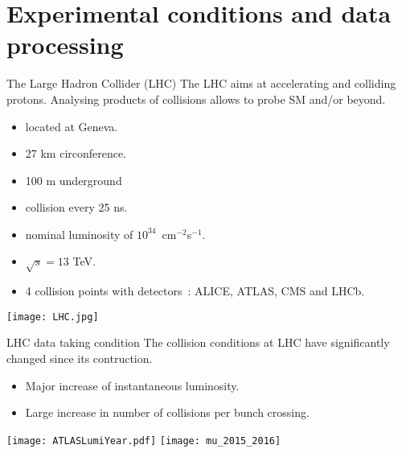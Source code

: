 \section{Experimental conditions and data processing}
\frame{\tableofcontents[currentsection]}

\begin{frame}{The Large Hadron Collider (LHC)}
  The LHC aims at accelerating and colliding protons.
  Analysing products of collisions allows to probe SM and/or beyond.
  \vfill
  
  \begin{minipage}{0.49\linewidth}
    \begin{itemize}
    \item located at Geneva.
    \item 27 km circonference.
    \item 100 m underground
    \item collision every 25 ns.
    \item nominal luminosity of $10^{34}$~cm$^{-2}$s$^{-1}$.
    \item $\sqrt{s}=13$ TeV.
    \item 4 collision points with detectors~: ALICE, ATLAS, CMS and LHCb.
    \end{itemize}
    \end{minipage}
  \hfill
  \begin{minipage}{0.49\linewidth}
    \texttt{[image: LHC.jpg]}
    \end{minipage}
\end{frame}
\begin{frame}{LHC data taking condition}
  The collision conditions at LHC have significantly changed since its contruction.
  \begin{itemize}
  \item Major increase of instantaneous luminosity.
  \item Large increase in number of collisions per bunch crossing.
  \end{itemize}

  \begin{center} \texttt{[image: ATLASLumiYear.pdf]}
  \texttt{[image: mu\_2015\_2016]} \end{center}
\end{frame}
